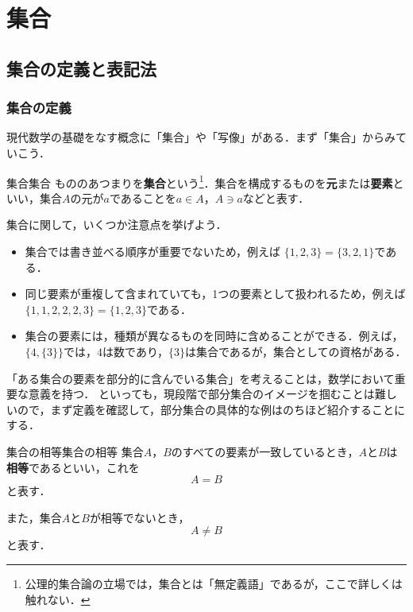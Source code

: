 \documentclass[a4paper,11pt]{ltjsarticle}
\renewcommand{\emph}[1]{\textbf{#1}}
\begin{document}
      \section{集合}
        \subsection{集合の定義と表記法}
      
        \subsubsection{集合の定義}
      
        現代数学の基礎をなす概念に「集合」や「写像」がある．まず「集合」からみていこう．
        \begin{definition}{集合}{集合}
            もののあつまりを\emph{集合}という\footnote{公理的集合論の立場では，集合とは「無定義語」であるが，ここで詳しくは触れない．}．集合を構成するものを\emph{元}または\emph{要素}といい，集合$A$の元が$a$であることを$a \in A$，$A \ni a$などと表す．
        \end{definition}
        
        集合に関して，いくつか注意点を挙げよう．
        
        \begin{itemize}
            \item 集合では書き並べる順序が重要でないため，例えば $\{1, 2, 3\} = \{3, 2, 1\}$である．
            \item 同じ要素が重複して含まれていても，1つの要素として扱われるため，例えば$\{1, 1, 2, 2, 2, 3\} = \{1, 2, 3\}$である．
            \item 集合の要素には，種類が異なるものを同時に含めることができる．例えば，$\{4, \{3\}\}$では，$4$は数であり，$\{3\}$は集合であるが，集合としての資格がある．
        \end{itemize}
      
        「ある集合の要素を部分的に含んでいる集合」を考えることは，数学において重要な意義を持つ．
        といっても，現段階で部分集合のイメージを掴むことは難しいので，まず定義を確認して，部分集合の具体的な例はのちほど紹介することにする．
        
        \begin{definition}{集合の相等}{集合の相等}
            集合$A$，$B$のすべての要素が一致しているとき，$A$と$B$は\emph{相等}であるといい，これを
            \[
            A = B
            \]
            と表す．

            また，集合$A$と$B$が相等でないとき，
            \[
            A \ne B
            \]
            と表す．
        \end{definition}
\end{document}

